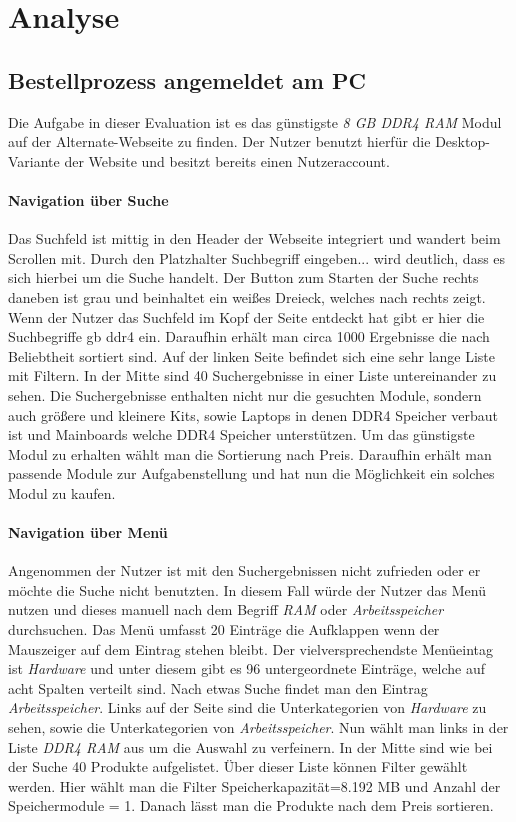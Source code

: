 \documentclass[	12pt, 
				a4paper, 
				BCOR=10mm, %
				DIV=12, 
				parskip=half, %
				headings=small, %
				twoside, %
				ngerman,
				bibliography=totoc,index=totoc, listof=totoc,
				numbers=noendperiod
				]{scrbook} %
\theoremstyle{plain}%
\theoremstyle{definition}
\theoremstyle{remark}
\begin{document}
\section{Analyse}
\subsection{Bestellprozess angemeldet am PC}
Die Aufgabe in dieser Evaluation ist es das günstigste \textit{8 GB DDR4 RAM} Modul auf der Alternate-Webseite zu finden. Der Nutzer benutzt hierfür die Desktop-Variante der Website und besitzt bereits einen Nutzeraccount.
\paragraph{Navigation über Suche}
Das Suchfeld ist mittig in den Header der Webseite integriert und wandert beim Scrollen mit. Durch den Platzhalter \glqq Suchbegriff eingeben...\grqq{} wird deutlich, dass es sich hierbei um die Suche handelt. Der Button zum Starten der Suche rechts daneben ist grau und beinhaltet ein weißes Dreieck, welches nach rechts zeigt.
Wenn der Nutzer das Suchfeld im Kopf der Seite entdeckt hat gibt er hier die Suchbegriffe  gb ddr4\grqq{} ein. Daraufhin erhält man circa 1000 Ergebnisse die nach Beliebtheit sortiert sind. Auf der linken Seite befindet sich eine sehr lange Liste mit Filtern. In der Mitte sind 40 Suchergebnisse in einer Liste untereinander zu sehen. Die Suchergebnisse enthalten nicht nur die gesuchten Module, sondern auch größere und kleinere Kits, sowie Laptops in denen DDR4 Speicher verbaut ist und Mainboards welche DDR4 Speicher unterstützen.
Um das günstigste Modul zu erhalten wählt man die Sortierung nach Preis. Daraufhin erhält man passende Module zur Aufgabenstellung und hat nun die Möglichkeit ein solches Modul zu kaufen.
\paragraph{Navigation über Menü}
Angenommen der Nutzer ist mit den Suchergebnissen nicht zufrieden oder er möchte die Suche nicht benutzten. In diesem Fall würde der Nutzer das Menü nutzen und dieses manuell nach dem Begriff \textit{RAM} oder \textit{Arbeitsspeicher} durchsuchen. Das Menü umfasst 20 Einträge die Aufklappen wenn der Mauszeiger auf dem Eintrag stehen bleibt. Der vielversprechendste Menüeintag ist \textit{Hardware} und unter diesem gibt es 96 untergeordnete Einträge, welche auf acht Spalten verteilt sind. Nach etwas Suche findet man den Eintrag \textit{Arbeitsspeicher}. Links auf der Seite sind die Unterkategorien von \textit{Hardware} zu sehen, sowie die Unterkategorien von \textit{Arbeitsspeicher}. Nun wählt man links in der Liste \textit{DDR4 RAM} aus um die Auswahl zu verfeinern. In der Mitte sind wie bei der Suche 40 Produkte aufgelistet. Über dieser Liste können Filter gewählt werden. Hier wählt man die Filter \glqq Speicherkapazität=8.192 MB\grqq{} und \glqq Anzahl der Speichermodule = 1\grqq{}. Danach lässt man die Produkte nach dem Preis sortieren.
\end{document}
